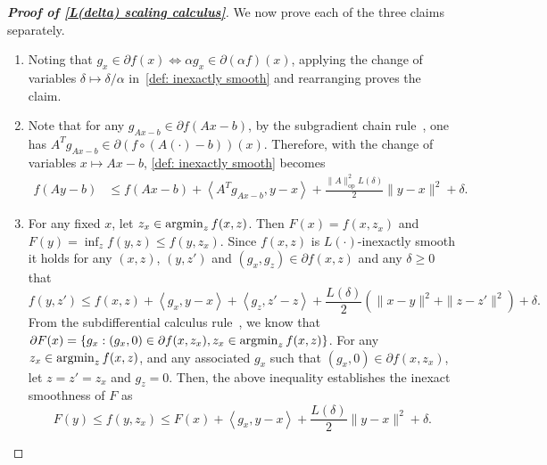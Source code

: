 \documentclass[11pt, hidelinks]{article}
\numberwithin{equation}{section}
\newcommand{\argmin}{\operatornamewithlimits{argmin}}
\theoremstyle{thmstyletwo}%
\numberwithin{equation}{section}
\newcommand{\inner}[2]{\left\langle {#1}, {#2} \right\rangle}
\begin{document}
\begin{proof}[\bf Proof of \cref{L(delta) scaling calculus}] 
We now prove each of the three claims separately.
    \begin{enumerate}
        \item Noting that $g_x \in \partial f(x) \Longleftrightarrow \alpha g_x \in \partial (\alpha f)(x)$, applying the change of variables $\delta \mapsto \delta/\alpha$ in~\eqref{def: inexactly smooth} and rearranging proves the claim.
        \item Note that for any $g_{Ax-b} \in \partial f(Ax-b)$, by the subgradient chain rule~\cite[Corollary 16.72]{bauschke}, one has $A^T g_{Ax-b} \in \partial (f \circ (A(\cdot) -b))(x)$. Therefore, with the change of variables $x \mapsto Ax-b$, \eqref{def: inexactly smooth} becomes
        \begin{eqnarray*}
            f(Ay-b)
            &\leq f(Ax-b) + \inner{A^Tg_{Ax-b}}{y-x}+\frac{\|A\|_{\mathrm{op}}^2L(\delta)}{2}\|y-x\|^2+\delta.
            \end{eqnarray*}
            
        \item For any fixed $x$, let $z_x \in \argmin_{z} f(x,z)$. Then $F(x) = f(x,z_x)$ and $F(y) = \inf_z f(y,z) \leq f(y,z_x)$. Since $f(x,z)$ is $L(\cdot)$-inexactly smooth it holds for any $(x,z)$, $(y,z')$ and $(g_x, g_z) \in \partial f(x,z)$ and any $\delta \geq 0$ that $$f(y,z') \leq f(x,z) + \inner{g_x}{y-x}+\inner{g_z}{z'-z}+\frac{L(\delta)}{2}(\|x-y\|^2+\|z-z'\|^2) + \delta.$$
        From the subdifferential calculus rule~\cite[Theorem 1]{infprojection}, we know that $\partial F(x) = \{g_x : (g_x, 0) \in \partial f(x,z_x), z_x \in \argmin_z f(x,z)\}$. For any $z_x \in \argmin_z f(x,z)$, and any associated $g_x$ such that $(g_x,0) \in \partial f(x,z_x)$, let  $z = z' = z_x$ and $g_z=0$. Then, the above inequality establishes the inexact smoothness of $F$ as
        $$F(y) \leq f(y,z_x) \leq F(x) + \inner{g_x}{y-x} + \frac{L(\delta)}{2}\|y-x\|^2+\delta.  $$
    \end{enumerate}
\end{proof}
\end{document}
